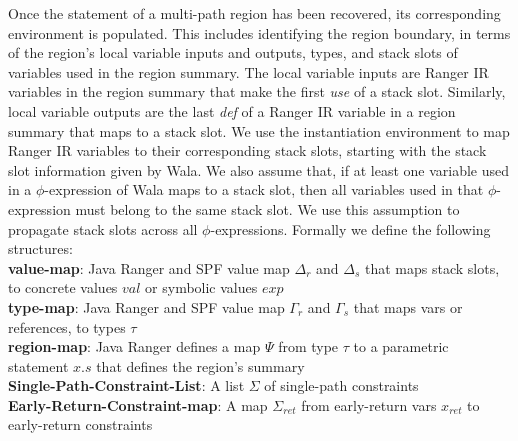 Once the statement of a multi-path region has been recovered, its corresponding environment is populated.
%
This includes identifying the region boundary, in terms of the region\rq s local variable inputs and outputs, types, and stack
slots of variables used in the region summary.
%
%
%
The local variable inputs are Ranger IR variables in the region summary that make the first \textit{use} of a
stack slot.
%
Similarly, local variable outputs are the last \textit{def} of a Ranger IR variable in a region summary that maps to a
stack slot.
%
%
%
We use the instantiation environment to map Ranger IR variables to their corresponding stack slots, starting with
the stack slot information given by Wala.
%
%
%
We also assume that, if at least one variable used in a $\phi$-expression of Wala maps to a stack slot, then all variables
used in that $\phi$-expression must belong to the same stack slot.
%
We use this assumption to propagate stack slots across all $\phi$-expressions.
%
%
Formally we define the following structures: \\
\textbf{value-map}: Java Ranger and SPF value map $\Delta_r$ and $\Delta_s$  that maps stack slots, to concrete values $val$ or symbolic values $exp$ \\
\textbf{type-map}: Java Ranger and SPF value map $\Gamma_r$ and $\Gamma_s$  that maps vars or references, to types $\tau$\\
\textbf{region-map}: Java Ranger defines a map $\Psi$ from type $\tau$  to a parametric statement $x.s$ that defines the region\rq s summary\\
\textbf{Single-Path-Constraint-List}: A list $\Sigma$ of single-path constraints\\
\textbf{Early-Return-Constraint-map}: A map $\Sigma_{ret}$ from early-return vars $x_{ret}$ to early-return constraints

